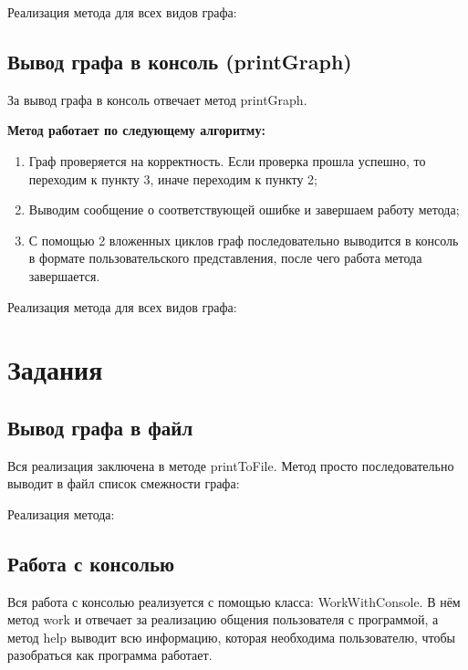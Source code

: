 \documentclass[bachelor, och, pract]{SCWorks}
\begin{document}
Реализация метода для всех видов графа:
\bigskip


\bigskip

\subsection{Вывод графа в консоль (printGraph)}

За вывод графа в консоль отвечает метод printGraph.
\bigskip

\textbf{Метод работает по следующему алгоритму:}

\begin{enumerate}
  \item {Граф проверяется на корректность. Если проверка прошла успешно,
  то переходим к пункту 3, иначе переходим к пункту 2;}
  \item {Выводим сообщение о соответствующей ошибке и завершаем работу метода;}
  \item {С помощью 2 вложенных циклов граф последовательно выводится в консоль в
  формате пользовательского представления, после чего работа метода завершается.}
\end{enumerate}

Реализация метода для всех видов графа:
\bigskip


\bigskip

\section{Задания}

\subsection{Вывод графа в файл}

Вся реализация заключена в методе printToFile. Метод
просто последовательно выводит в файл список смежности графа:
\bigskip

Реализация метода:
\bigskip


\bigskip

\subsection{Работа с консолью}

Вся работа с консолью реализуется с помощью класса: WorkWithConsole.
В нём метод work и отвечает за реализацию общения пользователя с программой,
а метод help выводит всю информацию, которая необходима пользователю, чтобы
разобраться как программа работает.
\bigskip
\end{document}
